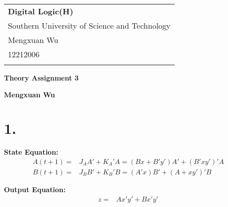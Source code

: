 \documentclass[a4paper,12pt]{article}
\begin{document}
\thispagestyle{empty} %

\begin{tabular}{p{15.5cm}}
{\large \bf Digital Logic(H)} \\
Southern University of Science and Technology \\ Mengxuan Wu \\ 12212006 \\
\hline
\\
\end{tabular}

\vspace*{0.3cm} %

\begin{center}
	{\Large \bf Theory Assignment 3}
	\vspace{2mm}

	{\bf Mengxuan Wu}
		
\end{center}  

\vspace{0.4cm}

\section*{1.}

\textbf{State Equation:}
\begin{align*}
	A(t+1) =& J_A A' + K_A' A = (Bx + B'y')A' + (B'xy')'A \\
	B(t+1) =& J_B B' + K_B' B = (A'x)B' + (A + xy')'B 
\end{align*}

\textbf{Output Equation: }
\begin{align*}
	z =& Ax'y' + Bx'y'
\end{align*}
\end{document}
